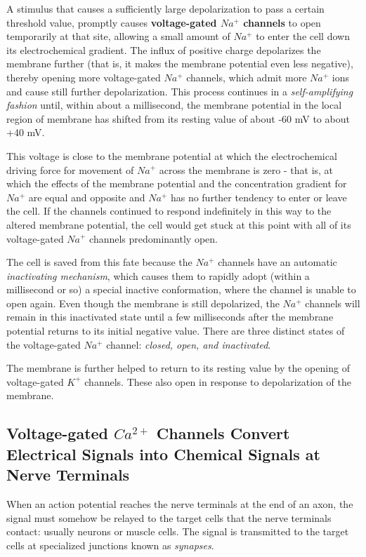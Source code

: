A stimulus that causes a sufficiently large depolarization to pass a certain threshold
value, promptly causes \textbf{voltage-gated $Na^{+}$ channels} to open temporarily
at that site, allowing a small amount of $Na^{+}$ to enter the cell down
its electrochemical gradient. The influx of positive charge depolarizes
the membrane further (that is, it makes the membrane potential even
less negative), thereby opening more voltage-gated $Na^{+}$ channels, which
admit more $Na^{+}$ ions and cause still further depolarization. This process
continues in a \textit{self-amplifying fashion} until, within about a millisecond,
the membrane potential in the local region of membrane has shifted from
its resting value of about -60 mV to about +40 mV. 

This voltage is close to the membrane potential at which the electrochemical
driving force for movement of $Na^{+}$ across the membrane is zero - that
is, at which the effects of the membrane potential and the concentration
gradient for $Na^{+}$ are equal and opposite and $Na^{+}$ has no further tendency
to enter or leave the cell. If the channels continued to respond indefinitely
in this way to the altered membrane potential, the cell would get stuck
at this point with all of its voltage-gated $Na^{+}$ channels predominantly
open.

The cell is saved from this fate because the $Na^{+}$ channels have an automatic
\textit{inactivating mechanism}, which causes them to rapidly adopt
(within a millisecond or so) a special inactive conformation, where the
channel is unable to open again. Even though the membrane is still depolarized,
the $Na^{+}$ channels will remain in this inactivated state until a few
milliseconds after the membrane potential returns to its initial negative
value. There are three distinct states of the voltage-gated
$Na^{+}$ channel: \textit{closed, open, and inactivated}.

The membrane is further helped to return to its resting value by the opening
of voltage-gated $K^{+}$ channels. These also open in response to depolarization
of the membrane.

\subsection{Voltage-gated $Ca^{2+}$ Channels Convert Electrical Signals into Chemical Signals at Nerve Terminals}

When an action potential reaches the nerve terminals at the end of an
axon, the signal must somehow be relayed to the target cells that the
nerve terminals contact: usually neurons or muscle cells. The signal is
transmitted to the target cells at specialized junctions known as \textit{synapses}.

